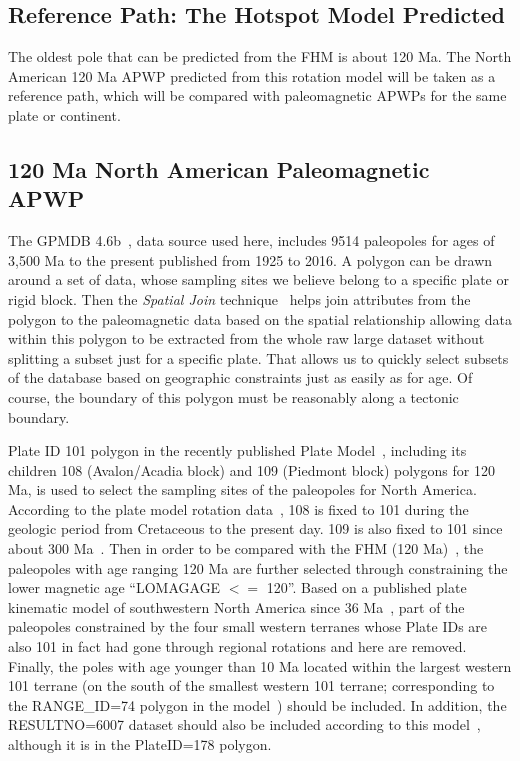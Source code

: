 \subsection{Reference Path: The Hotspot Model Predicted}

The oldest pole that can be predicted from the FHM is about 120 Ma. The North
American 120 Ma APWP predicted from this rotation model will be
taken as a reference path, which will be compared with paleomagnetic APWPs for
the same plate or continent.

\subsection{120 Ma North American Paleomagnetic APWP}

The GPMDB 4.6b~\cite{P05}, data source used here, includes 9514 paleopoles for
ages of 3,500 Ma to the present published from 1925 to 2016. A polygon
can be drawn around a set of data, whose sampling sites we believe belong to a
specific plate or rigid block. Then the {\em Spatial Join\/}
technique~\cite{J07} helps join attributes from the polygon to the paleomagnetic
data based on the spatial relationship allowing data within this polygon to be
extracted from the whole raw large dataset without splitting a subset just for a
specific plate. That allows us to quickly select subsets of the database based
on geographic constraints just as easily as for age. Of course, the boundary of
this polygon must be reasonably along a tectonic boundary.

Plate ID 101 polygon in the recently published Plate Model~\cite{Y18}, including
its children 108 (Avalon/Acadia block) and 109 (Piedmont block) polygons for
120 Ma, is used to select the sampling sites of the paleopoles for
North America. According to the plate model rotation data~\cite{Y18}, 108 is
fixed to 101 during the geologic period from Cretaceous to the present day. 109
is also fixed to 101 since about 300 Ma~\cite{C14}. Then in order to be compared
with the FHM (120 Ma)~\cite{M93,M99}, the paleopoles with age
ranging 120 Ma are further selected through constraining the lower
magnetic age ``LOMAGAGE $<=$ 120''. Based on a published plate kinematic model
of southwestern North America since 36 Ma~\cite{Mc06}, part of the paleopoles
constrained by the four small western terranes whose Plate IDs are also 101 in
fact had gone through regional rotations and here are removed. Finally, the
poles with age younger than 10 Ma located within the largest western 101 terrane
(on the south of the smallest western 101 terrane; corresponding to the
RANGE\_ID=74 polygon in the model~\cite{Mc06}) should be included. In addition,
the RESULTNO=6007 dataset should also be included according to this
model~\cite{Mc06}, although it is in the PlateID=178 polygon.


